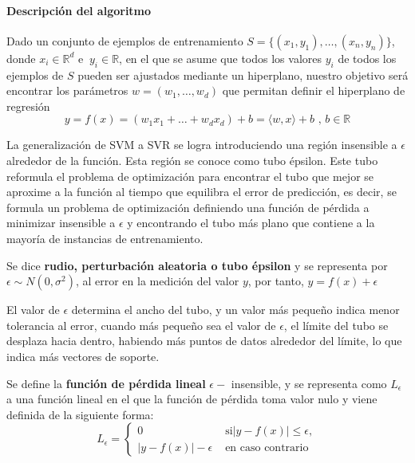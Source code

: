 \documentclass[12pt,a4paper,]{book}
\let\oldparagraph\paragraph
\renewcommand{\paragraph}[1]{\oldparagraph{#1}\mbox{}}
\numberwithin{dummy}{section}
\theoremstyle{ocrenumbox}
\theoremstyle{blacknumex}
\theoremstyle{blacknumbox}
\theoremstyle{ocrenum}
\theoremstyle{ocrenum}
\begin{document}
\hypertarget{descripciuxf3n-del-algoritmo}{%
\paragraph{Descripción del
algoritmo}\label{descripciuxf3n-del-algoritmo}}

Dado un conjunto de ejemplos de entrenamiento
\(S = \big\{(x_1,y_1), \dots,(x_n,y_n)\big\}\), donde
\(x_i \in \mathbb R^d \text{ e }\ y_i \in \mathbb R\), en el que se
asume que todos los valores \(y_i\) de todos los ejemplos de \(S\)
pueden ser ajustados mediante un hiperplano, nuestro objetivo será
encontrar los parámetros \(w = (w_1,\dots,w_d)\) que permitan definir el
hiperplano de regresión
\[y=f(x) = (w_1x_1+\dots+w_dx_d) + b = \langle w,x \rangle+b \text{ , } b \in \mathbb R\]

La generalización de SVM a SVR se logra introduciendo una región
insensible a \(\epsilon\) alrededor de la función. Esta región se conoce
como tubo épsilon. Este tubo reformula el problema de optimización para
encontrar el tubo que mejor se aproxime a la función al tiempo que
equilibra el error de predicción, es decir, se formula un problema de
optimización definiendo una función de pérdida a minimizar insensible a
\(\epsilon\) y encontrando el tubo más plano que contiene a la mayoría
de instancias de entrenamiento.

Se dice \textbf{rudio, perturbación aleatoria o tubo épsilon} y se
representa por \(\epsilon \sim N(0,\sigma^2)\), al error en la medición
del valor \(y\), por tanto, \(y=f(x) + \epsilon\)

El valor de \(\epsilon\) determina el ancho del tubo, y un valor más
pequeño indica menor tolerancia al error, cuando más pequeño sea el
valor de \(\epsilon\), el límite del tubo se desplaza hacia dentro,
habiendo más puntos de datos alrededor del límite, lo que indica más
vectores de soporte.

Se define la \textbf{función de pérdida lineal} \(\epsilon-\)
insensible, y se representa como \(L_{\epsilon}\) a una función lineal
en el que la función de pérdida toma valor nulo y viene definida de la
siguiente forma: \[L_{\epsilon} = 
\begin{cases} 
0 & \text{ si} |y-f(x)| \leq \epsilon, \\ 
|y-f(x)| - \epsilon & \text{ en caso contrario }
\end{cases}\]
\end{document}
